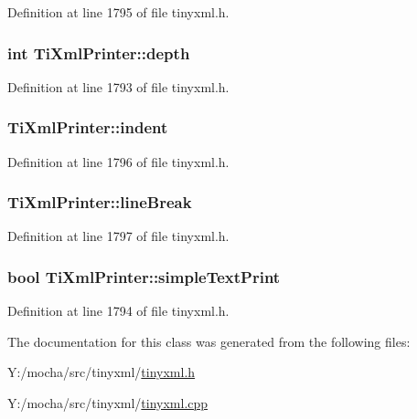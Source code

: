 Definition at line 1795 of file tinyxml.h.

\hypertarget{class_ti_xml_printer_a7e11330449daea912320c22f84387df7}{
\subsubsection[{depth}]{\setlength{\rightskip}{0pt plus 5cm}int {\bf TiXmlPrinter::depth}}}
\label{class_ti_xml_printer_a7e11330449daea912320c22f84387df7}


Definition at line 1793 of file tinyxml.h.

\hypertarget{class_ti_xml_printer_a356b8d2641b31176dcc6f96cd31e3bd6}{
\subsubsection[{indent}]{ {\bf TiXmlPrinter::indent}}}
\label{class_ti_xml_printer_a356b8d2641b31176dcc6f96cd31e3bd6}


Definition at line 1796 of file tinyxml.h.

\hypertarget{class_ti_xml_printer_ab2634608fe945f32e97473d45f012e2b}{
\subsubsection[{lineBreak}]{ {\bf TiXmlPrinter::lineBreak}}}
\label{class_ti_xml_printer_ab2634608fe945f32e97473d45f012e2b}


Definition at line 1797 of file tinyxml.h.

\hypertarget{class_ti_xml_printer_a2dceede5ae9bb8948f1ecaabb24ab2fb}{
\subsubsection[{simpleTextPrint}]{\setlength{\rightskip}{0pt plus 5cm}bool {\bf TiXmlPrinter::simpleTextPrint}}}
\label{class_ti_xml_printer_a2dceede5ae9bb8948f1ecaabb24ab2fb}


Definition at line 1794 of file tinyxml.h.



The documentation for this class was generated from the following files:\begin{DoxyCompactItemize}
\item 
Y:/mocha/src/tinyxml/\hyperlink{tinyxml_8h}{tinyxml.h}\item 
Y:/mocha/src/tinyxml/\hyperlink{tinyxml_8cpp}{tinyxml.cpp}\end{DoxyCompactItemize}
